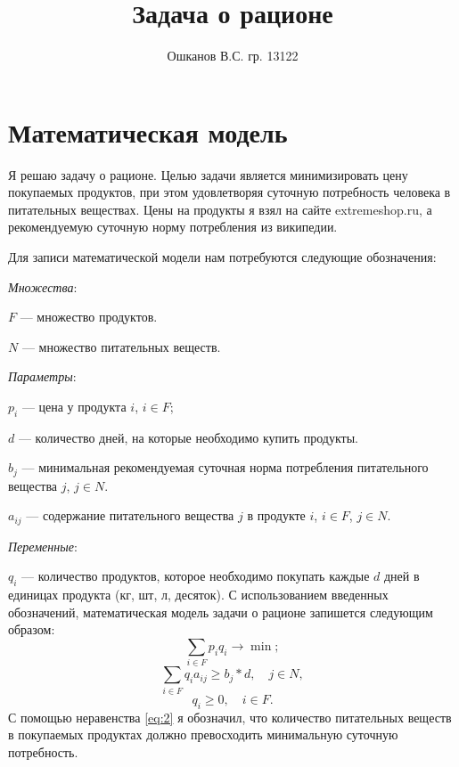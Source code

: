 \documentclass[]{article}
\title{Задача о рационе}
\author{Ошканов В.С. гр. 13122}
\begin{document}
\maketitle
\section{Математическая модель}

Я решаю задачу о рационе. Целью задачи является минимизировать цену покупаемых
продуктов, при этом удовлетворяя суточную потребность человека в питательных веществах.
Цены на продукты я взял на сайте extremeshop.ru, а рекомендуемую суточную
норму потребления из википедии.

Для записи математической модели нам потребуются следующие обозначения:
\par
\textit{Множества}:
\par\noindent
$F$ --- множество продуктов.
\par\noindent
$N$ --- множество питательных веществ.
\par
\textit{Параметры}:
\par\noindent
$p_i$ --- цена у продукта $i$, $i\in F$;
\par\noindent
$d$ --- количество дней, на которые необходимо купить продукты.
\par\noindent
$b_{j}$ --- минимальная рекомендуемая суточная норма потребления питательного вещества $j$, $j\in N$.
\par\noindent
$a_{ij}$ --- содержание питательного вещества $j$ в продукте $i$, $i\in F$, $j\in N$.
\par
\textit{Переменные}:
\par\noindent
$q_i$ --- количество продуктов, которое необходимо покупать каждые $d$ дней в
единицах продукта (кг, шт, л, десяток).
С использованием введенных обозначений, математическая модель задачи о рационе
запишется следующим образом:
\begin{equation}
\sum_{i\in F}p_iq_i\rightarrow\min;
\end{equation}
\begin{equation}\label{eq:2}
	\sum_{i\in F}
			q_ia_{ij} \geq b_j*d,\quad j\in N,
\end{equation}
\begin{equation}
      q_i \geq 0,\quad i\in F.
\end{equation}
С помощью неравенства \eqref{eq:2} я обозначил, что количество питательных
веществ в покупаемых продуктах должно превосходить минимальную суточную
потребность.
\end{document}

